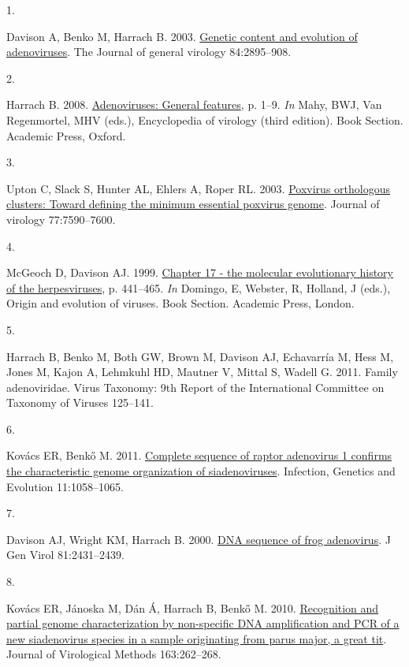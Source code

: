 \documentclass[
]{article}
\newlength{\cslhangindent}
\newlength{\csllabelwidth}
\newenvironment{CSLReferences}[2] %
 {\begin{list}{}{%
  \setlength{\itemindent}{0pt}
  \setlength{\leftmargin}{0pt}
  \setlength{\parsep}{0pt}
  \ifodd #1
   \setlength{\leftmargin}{\cslhangindent}
   \setlength{\itemindent}{-1\cslhangindent}
  \fi
  \setlength{\itemsep}{#2\baselineskip}}}
 {\end{list}}
\newcommand{\CSLLeftMargin}[1]{\parbox[t]{\csllabelwidth}{\strut#1\strut}}
\newcommand{\CSLRightInline}[1]{\parbox[t]{\linewidth - \csllabelwidth}{\strut#1\strut}}
\begin{document}
\label{refs}
\begin{CSLReferences}{0}{1}
\CSLLeftMargin{1. }%
\CSLRightInline{Davison A, Benko M, Harrach B. 2003.
\href{https://doi.org/10.1099/vir.0.19497-0}{Genetic content and
evolution of adenoviruses}. The Journal of general virology
84:2895--908.}

\CSLLeftMargin{2. }%
\CSLRightInline{Harrach B. 2008.
\href{https://doi.org/10.1016/B978-012374410-4.00680-4}{Adenoviruses:
General features}, p. 1--9. \emph{In} Mahy, BWJ, Van Regenmortel, MHV
(eds.), Encyclopedia of virology (third edition). Book Section. Academic
Press, Oxford.}

\CSLLeftMargin{3. }%
\CSLRightInline{Upton C, Slack S, Hunter AL, Ehlers A, Roper RL. 2003.
\href{https://doi.org/10.1128/jvi.77.13.7590-7600.2003}{Poxvirus
orthologous clusters: Toward defining the minimum essential poxvirus
genome}. Journal of virology 77:7590--7600.}

\CSLLeftMargin{4. }%
\CSLRightInline{McGeoch D, Davison AJ. 1999.
\href{https://doi.org/10.1016/B978-012220360-2/50018-0}{Chapter 17 - the
molecular evolutionary history of the herpesviruses}, p. 441--465.
\emph{In} Domingo, E, Webster, R, Holland, J (eds.), Origin and
evolution of viruses. Book Section. Academic Press, London.}

\CSLLeftMargin{5. }%
\CSLRightInline{Harrach B, Benko M, Both GW, Brown M, Davison AJ,
Echavarría M, Hess M, Jones M, Kajon A, Lehmkuhl HD, Mautner V, Mittal
S, Wadell G. 2011. Family adenoviridae. Virus Taxonomy: 9th Report of
the International Committee on Taxonomy of Viruses 125--141.}

\CSLLeftMargin{6. }%
\CSLRightInline{Kovács ER, Benkő M. 2011.
\href{https://doi.org/10.1016/j.meegid.2011.03.021}{Complete sequence of
raptor adenovirus 1 confirms the characteristic genome organization of
siadenoviruses}. Infection, Genetics and Evolution 11:1058--1065.}

\CSLLeftMargin{7. }%
\CSLRightInline{Davison AJ, Wright KM, Harrach B. 2000.
\href{https://doi.org/10.1099/0022-1317-81-10-2431}{DNA sequence of frog
adenovirus}. J Gen Virol 81:2431--2439.}

\CSLLeftMargin{8. }%
\CSLRightInline{Kovács ER, Jánoska M, Dán Á, Harrach B, Benkő M. 2010.
\href{https://doi.org/10.1016/j.jviromet.2009.10.007}{Recognition and
partial genome characterization by non-specific DNA amplification and
PCR of a new siadenovirus species in a sample originating from parus
major, a great tit}. Journal of Virological Methods 163:262--268.}


\end{CSLReferences}
\end{document}
